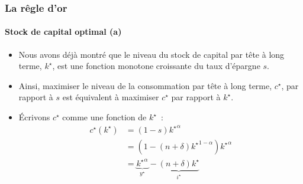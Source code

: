 \documentclass[10pt,notheorems]{beamer}
\theoremstyle{plain}
\theoremstyle{definition} %
\begin{document}
\begin{frame}
  \frametitle{La rêgle d'or}
  \framesubtitle{Stock de capital optimal (a)}

  \bigskip

  \begin{itemize}

  \item Nous avons déjà montré que le niveau du stock de capital par tête à long terme, $k^{\star}$, est une fonction monotone croissante du taux d'épargne $s$.\newline

  \item Ainsi, maximiser le niveau de la consommation par tête à long terme, $c^{\star}$, par rapport à $s$ est équivalent à maximiser $c^{\star}$ par rapport à $k^{\star}$.\newline

  \item Écrivons $c^{\star}$ comme une fonction de $k^{\star}$~:
    \[
      \begin{split}
        c^{\star}(k^{\star}) &= \left(1-s\right)\left.k^{\star}\right.^{\alpha}\\
        &= \left(1-(n+\delta)\left.k^{\star}\right.^{1-\alpha}\right)\left.k^{\star}\right.^{\alpha}\\
        &= \underbrace{\left.k^{\star}\right.^{\alpha}}_{y^{\star}}-\underbrace{(n+\delta)k^{\star}}_{i^{\star}}\\
      \end{split}
    \]

  \end{itemize}

\end{frame}
\end{document}
